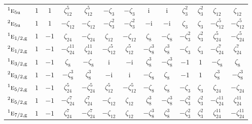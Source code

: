 \documentclass[10pt,a4paper]{article}
\makeatletter
\def\grouprule#1#2{\noalign{\marks\LTgroupmarks{\the\belowrulesep}\nobreak\vskip#1%
  \vskip\aboverulesep}\multispan\LT@cols\unskip{\leaders\hrule\@height#2\hfill\kern\z@}\cr
  \noalign{\penalty\LTrulebreak\vskip\belowrulesep\global\@lastruleclass\z@}}
\numberwithin{equation}{section}
\newcommand{\irr}[1]{\text{\normalfont\scshape #1}}
\newcommand{\conjpair}[1]{{}^{#1}}
\newcommand{\ptag}[1]{\mathrm{#1}}
\newcommand{\iunit}{\mathrm{i}}
\newcommand{\rootunity}[1]{\zeta_{#1}}
\makeatother
\begin{document}
{\begin{longtable}{@{}lcccccccccccc@{}}
$\conjpair{1}\irr{e}_{5\ptag{u}}$ & $1$ & $1$ & $\rootunity{12}^{5}$ & $\rootunity{12}^{5}$ & $-\rootunity{3}$ & $-\rootunity{3}$ & $\iunit{}$ & $\iunit{}$ & $\rootunity{3}^{2}$ & $\rootunity{3}^{2}$ & $\rootunity{12}$ & $\rootunity{12}$\\
$\conjpair{2}\irr{e}_{5\ptag{u}}$ & $1$ & $1$ & $-\rootunity{12}$ & $-\rootunity{12}$ & $-\rootunity{3}^{2}$ & $-\rootunity{3}^{2}$ & $-\iunit{}$ & $-\iunit{}$ & $\rootunity{3}$ & $\rootunity{3}$ & $-\rootunity{12}^{5}$ & $-\rootunity{12}^{5}$\\
\grouprule{0pt}{\lightrulewidth}
$\conjpair{1}\irr{e}_{1/2,\ptag{g}}$ & $1$ & $-1$ & $\rootunity{24}$ & $-\rootunity{24}$ & $\rootunity{12}$ & $-\rootunity{12}$ & $\rootunity{8}$ & $-\rootunity{8}$ & $-\rootunity{3}^{2}$ & $\rootunity{3}^{2}$ & $\rootunity{24}^{5}$ & $-\rootunity{24}^{5}$\\
$\conjpair{2}\irr{e}_{1/2,\ptag{g}}$ & $1$ & $-1$ & $-\rootunity{24}^{11}$ & $\rootunity{24}^{11}$ & $-\rootunity{12}^{5}$ & $\rootunity{12}^{5}$ & $-\rootunity{8}^{3}$ & $\rootunity{8}^{3}$ & $-\rootunity{3}$ & $\rootunity{3}$ & $-\rootunity{24}^{7}$ & $\rootunity{24}^{7}$\\
$\conjpair{1}\irr{e}_{3/2,\ptag{g}}$ & $1$ & $-1$ & $\rootunity{8}$ & $-\rootunity{8}$ & $\iunit{}$ & $-\iunit{}$ & $\rootunity{8}^{3}$ & $-\rootunity{8}^{3}$ & $-1$ & $1$ & $-\rootunity{8}$ & $\rootunity{8}$\\
$\conjpair{2}\irr{e}_{3/2,\ptag{g}}$ & $1$ & $-1$ & $-\rootunity{8}^{3}$ & $\rootunity{8}^{3}$ & $-\iunit{}$ & $\iunit{}$ & $-\rootunity{8}$ & $\rootunity{8}$ & $-1$ & $1$ & $\rootunity{8}^{3}$ & $-\rootunity{8}^{3}$\\
$\conjpair{1}\irr{e}_{5/2,\ptag{g}}$ & $1$ & $-1$ & $\rootunity{24}^{5}$ & $-\rootunity{24}^{5}$ & $\rootunity{12}^{5}$ & $-\rootunity{12}^{5}$ & $-\rootunity{8}$ & $\rootunity{8}$ & $-\rootunity{3}$ & $\rootunity{3}$ & $\rootunity{24}$ & $-\rootunity{24}$\\
$\conjpair{2}\irr{e}_{5/2,\ptag{g}}$ & $1$ & $-1$ & $-\rootunity{24}^{7}$ & $\rootunity{24}^{7}$ & $-\rootunity{12}$ & $\rootunity{12}$ & $\rootunity{8}^{3}$ & $-\rootunity{8}^{3}$ & $-\rootunity{3}^{2}$ & $\rootunity{3}^{2}$ & $-\rootunity{24}^{11}$ & $\rootunity{24}^{11}$\\
$\conjpair{1}\irr{e}_{7/2,\ptag{g}}$ & $1$ & $-1$ & $\rootunity{24}^{7}$ & $-\rootunity{24}^{7}$ & $-\rootunity{12}$ & $\rootunity{12}$ & $-\rootunity{8}^{3}$ & $\rootunity{8}^{3}$ & $-\rootunity{3}^{2}$ & $\rootunity{3}^{2}$ & $\rootunity{24}^{11}$ & $-\rootunity{24}^{11}$\\

\end{longtable}}
\end{document}
